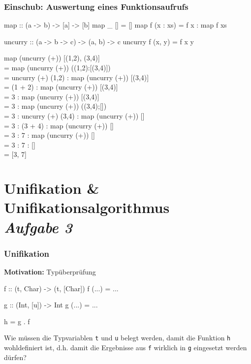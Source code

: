 \documentclass{beamer}
\begin{document}
{
\color{cdgray}
\begin{frame}[fragile, t] \frametitle{Einschub: Auswertung eines Funktionsaufrufs}
	\begin{codebox}
map :: (a -> b) -> [a] -> [b]
map _ []       = []
map f (x : xs) = f x : map f xs

uncurry :: (a -> b -> c) -> (a, b) -> c
uncurry f (x, y) = f x y
	\end{codebox}
	
	\footnotesize
	\begin{ttfamily}
		map (uncurry (+)) [(1,2), (3,4)] \\ \pause
		= map (uncurry (+)) ((1,2):[(3,4)]) \\
		= uncurry (+) (1,2) : map (uncurry (+)) [(3,4)] \\
		= (1 + 2) : map (uncurry (+)) [(3,4)] \\
		= 3 : map (uncurry (+)) [(3,4)] \\
		= 3 : map (uncurry (+)) ((3,4);[]) \\
		= 3 : uncurry (+) (3,4) : map (uncurry (+)) [] \\
		= 3 : (3 + 4) : map (uncurry (+)) [] \\
		= 3 : 7 : map (uncurry (+)) [] \\
		= 3 : 7 : [] \\
		= [3, 7]
	\end{ttfamily}

\end{frame}
}



\section{Unifikation \& Unifikationsalgorithmus \\ \textit{\normalsize Aufgabe 3}}


\begin{frame}[fragile] \frametitle{Unifikation}
	\footnotesize
	\textbf{Motivation:} Typüberprüfung
		 
	\begin{codebox}
f :: (t, Char) -> (t, [Char])
f (...) = ... 

g :: (Int, [u]) -> Int
g (...) = ...

h = g . f
	\end{codebox}
	
	\pause
	
	Wie müssen die Typvariablen \texttt{t} und \texttt{u} belegt werden, damit die Funktion \texttt{h} wohldefiniert ist, d.h. damit die Ergebnisse aus \texttt{f} wirklich in \texttt{g} eingesetzt werden dürfen?
\end{frame}
\end{document}
